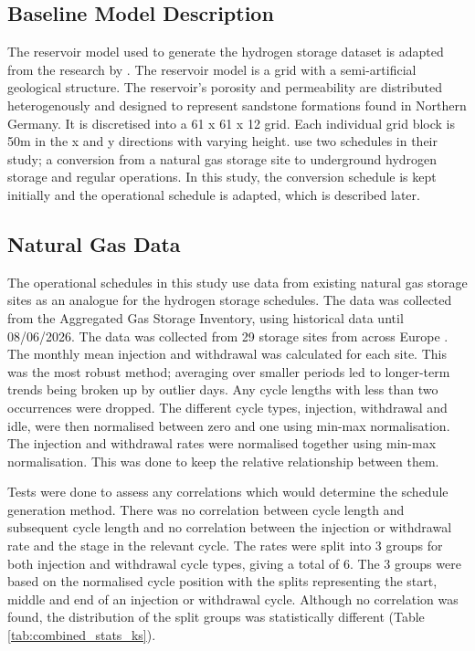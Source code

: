

\subsection{Baseline Model Description}
The reservoir model used to generate the hydrogen storage dataset is adapted from the research by \citet{Hogeweg_Benchmark}. The reservoir model is a grid with a semi-artificial geological structure. The reservoir's porosity and permeability are distributed heterogenously and designed to represent sandstone formations found in Northern Germany. It is discretised into a 61 x 61 x 12 grid. Each individual grid block is 50m in the x and y directions with varying height. \citet{Hogeweg_Benchmark} use two schedules in their study; a conversion from a natural gas storage site to underground hydrogen storage and regular operations. In this study, the conversion schedule is kept initially and the operational schedule is adapted, which is described later. 

\subsection{Natural Gas Data}
The operational schedules in this study use data from existing natural gas storage sites as an analogue for the hydrogen storage schedules. The data was collected from the Aggregated Gas Storage Inventory, using historical data until 08/06/2026. The data was collected from 29 storage sites from across Europe \citep{AGSI_data}. The monthly mean injection and withdrawal was calculated for each site. This was the most robust method; averaging over smaller periods led to longer-term trends being broken up by outlier days. Any cycle lengths with less than two occurrences were dropped. The different cycle types, injection, withdrawal and idle, were then normalised between zero and one using min-max normalisation. The injection and withdrawal rates were normalised together using min-max normalisation. This was done to keep the relative relationship between them.

Tests were done to assess any correlations which would determine the schedule generation method. There was no correlation between cycle length and subsequent cycle length and no correlation between the injection or withdrawal rate and the stage in the relevant cycle. The rates were split into 3 groups for both injection and withdrawal cycle types, giving a total of 6. The 3 groups were based on the normalised cycle position with the splits representing the start, middle and end of an injection or withdrawal cycle. Although no correlation was found, the distribution of the split groups was statistically different (Table \ref{tab:combined_stats_ks}). 


